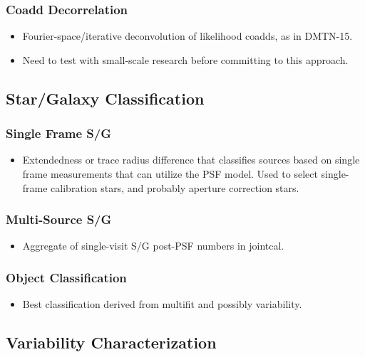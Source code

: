 \subsubsection{Coadd Decorrelation}
\label{sec:acCoaddDecorrelation}
\begin{itemize}
\item Fourier-space/iterative deconvolution of likelihood coadds, as in DMTN-15.
\item Need to test with small-scale research before committing to this approach.
\end{itemize}

\subsection{Star/Galaxy Classification}
\label{sec:acClassification}
\subsubsection{Single Frame S/G}
\label{sec:acSingleFrameClassification}
\begin{itemize}
\item Extendedness or trace radius difference that classifies sources based on single frame measurements that can utilize the PSF model.  Used to select single-frame calibration stars, and probably aperture correction stars.
\end{itemize}
\subsubsection{Multi-Source S/G}
\label{sec:acJointCalClassification}
\begin{itemize}
\item Aggregate of single-visit S/G post-PSF numbers in jointcal.
\end{itemize}
\subsubsection{Object Classification}
\label{sec:acObjectClassification}
\begin{itemize}
\item Best classification derived from multifit and possibly variability.
\end{itemize}

\subsection{Variability Characterization}
\label{sec:acVariabilityCharacterization}

